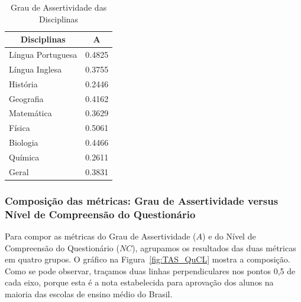 \begin{table}[htbp]
\caption{Grau de Assertividade das Disciplinas}
\centering
\begin{tabular}{|l|c|}
\hline
\multicolumn{1}{|c|}{\textbf{Disciplinas}} & \textbf{A} \\ \hline %
Língua Portuguesa & 0.4825 \\ \hline %
Língua Inglesa & 0.3755 \\ \hline %
História & 0.2446 \\ \hline %
Geografia & 0.4162 \\ \hline %
Matemática & 0.3629 \\ \hline %
Física & 0.5061 \\ \hline %
Biologia & 0.4466 \\ \hline %
Química & 0.2611 \\ \hline %
Geral & 0.3831 \\ \hline %
\end{tabular}
\label{tab:ADGDClass}
\end{table}

\subsubsection{Composição das métricas: Grau de Assertividade versus Nível de Compreensão do Questionário}
\label{subsection:AD_QuCL}

Para compor as métricas do Grau de Assertividade ($A$) e do Nível de Compreensão do Questionário ($NC$), agrupamos os resultados das duas métricas em quatro grupos. O gráfico na Figura~\ref{fig:TAS_QuCL} mostra a composição. Como se pode observar, traçamos duas linhas perpendiculares nos pontos 0,5 de cada eixo, porque esta é a nota estabelecida para aprovação dos alunos na maioria das escolas de ensino médio do Brasil.

